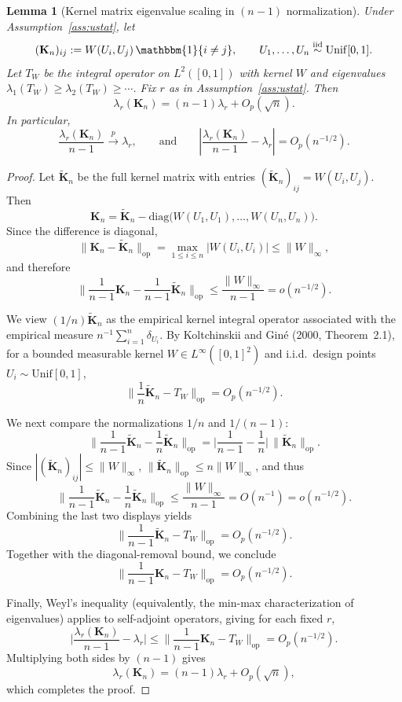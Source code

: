 \documentclass[11pt]{article}
\theoremstyle{plain}
\newtheorem{lemma}[theorem]{Lemma}
\theoremstyle{remark}
\newcommand{\op}{\mathrm{op}}
\begin{document}
\begin{lemma}[Kernel matrix eigenvalue scaling in $(n-1)$ normalization]
\label{lem:matconc}
Under Assumption~\ref{ass:ustat}, let
\[
(\mathbf{K}_n)_{ij} := W(U_i,U_j)\,\mathbbm{1}\{i\neq j\},
\qquad
U_1,\dots,U_n \stackrel{\mathrm{iid}}{\sim}\mathrm{Unif}[0,1].
\]
Let $T_W$ be the integral operator on $L^2([0,1])$ with kernel $W$ and eigenvalues
$\lambda_1(T_W)\ge \lambda_2(T_W)\ge \cdots$.
Fix $r$ as in Assumption~\ref{ass:ustat}. Then
\[
\lambda_r(\mathbf{K}_n) = (n-1)\lambda_r + O_p(\sqrt n).
\]
In particular,
\[
\frac{\lambda_r(\mathbf{K}_n)}{n-1}\xrightarrow{p}\lambda_r,
\qquad
\text{and}
\qquad
\left|\frac{\lambda_r(\mathbf{K}_n)}{n-1}-\lambda_r \right|=O_p(n^{-1/2}).
\]
\end{lemma}

\begin{proof}
Let $\widetilde{\mathbf K}_n$ be the full kernel matrix with entries
$(\widetilde{\mathbf K}_n)_{ij}=W(U_i,U_j)$.
Then
\[
\mathbf K_n
=
\widetilde{\mathbf K}_n
-
\mathrm{diag}\big(W(U_1,U_1),\dots,W(U_n,U_n)\big).
\]
Since the difference is diagonal,
\[
\|\mathbf K_n-\widetilde{\mathbf K}_n\|_{\op}
=
\max_{1\le i\le n}|W(U_i,U_i)|
\le \|W\|_\infty,
\]
and therefore
\[
\Big\|\frac{1}{n-1}\mathbf K_n-\frac{1}{n-1}\widetilde{\mathbf K}_n\Big\|_{\op}
\le \frac{\|W\|_\infty}{n-1}
= o(n^{-1/2}).
\]

We view $(1/n)\widetilde{\mathbf K}_n$ as the empirical kernel integral operator associated
with the empirical measure $n^{-1}\sum_{i=1}^n \delta_{U_i}$.
By Koltchinskii and Giné (2000, Theorem~2.1), for a bounded measurable kernel
$W\in L^\infty([0,1]^2)$ and i.i.d.\ design points $U_i\sim\mathrm{Unif}[0,1]$,
\[
\Big\|\frac{1}{n}\widetilde{\mathbf K}_n-T_W\Big\|_{\op}
=O_p(n^{-1/2}).
\]

We next compare the normalizations $1/n$ and $1/(n-1)$:
\[
\Big\|\frac{1}{n-1}\widetilde{\mathbf K}_n-\frac{1}{n}\widetilde{\mathbf K}_n\Big\|_{\op}
=
\Big|\frac{1}{n-1}-\frac{1}{n}\Big|\,\|\widetilde{\mathbf K}_n\|_{\op}.
\]
Since $|(\widetilde{\mathbf K}_n)_{ij}|\le \|W\|_\infty$,
$\|\widetilde{\mathbf K}_n\|_{\op}\le n\|W\|_\infty$, and thus
\[
\Big\|\frac{1}{n-1}\widetilde{\mathbf K}_n-\frac{1}{n}\widetilde{\mathbf K}_n\Big\|_{\op}
\le \frac{\|W\|_\infty}{n-1}
=O(n^{-1})
=o(n^{-1/2}).
\]
Combining the last two displays yields
\[
\Big\|\frac{1}{n-1}\widetilde{\mathbf K}_n-T_W\Big\|_{\op}
=O_p(n^{-1/2}).
\]
Together with the diagonal-removal bound, we conclude
\[
\Big\|\frac{1}{n-1}\mathbf K_n-T_W\Big\|_{\op}
=O_p(n^{-1/2}).
\]

Finally, Weyl’s inequality (equivalently, the min-max characterization of eigenvalues)
applies to self-adjoint operators, giving for each fixed $r$,
\[
\Big|\frac{\lambda_r(\mathbf K_n)}{n-1}-\lambda_r\Big|
\le
\Big\|\frac{1}{n-1}\mathbf K_n-T_W\Big\|_{\op}
=O_p(n^{-1/2}).
\]
Multiplying both sides by $(n-1)$ gives
\[
\lambda_r(\mathbf K_n)
=
(n-1)\lambda_r
+
O_p(\sqrt n),
\]
which completes the proof.
\end{proof}
\end{document}

